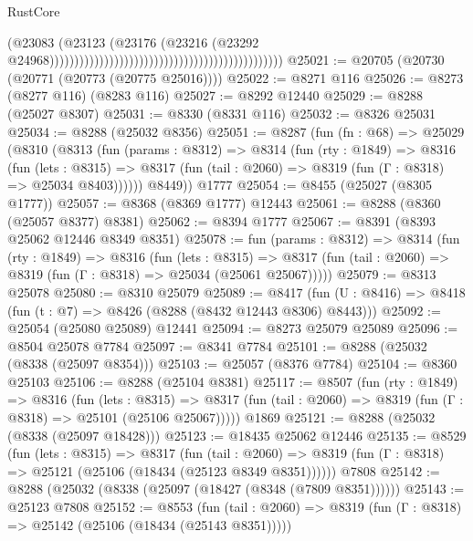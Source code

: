 \begin{lexlean}{RustCore}
\begin{coremodule}
                                                                                        (@23083
                                                                                          (@23123
                                                                                            (@23176
                                                                                              (@23216
                                                                                                (@23292
                                                                                                  @24968)))))))))))))))))))))))))))))))))))))))))))))))
@25021 := @20705 (@20730 (@20771 (@20773 (@20775 @25016))))
@25022 := @8271 @116
@25026 := @8273 (@8277 @116) (@8283 @116)
@25027 := @8292 @12440
@25029 := @8288 (@25027 @8307)
@25031 := @8330 (@8331 @116)
@25032 := @8326 @25031
@25034 := @8288 (@25032 @8356)
@25051 := @8287
    (fun (fn : @68) =>
    @25029
      (@8310
        (@8313
          (fun (params : @8312) =>
          @8314
            (fun (rty : @1849) =>
            @8316
              (fun (lets : @8315) =>
              @8317 (fun (tail : @2060) => @8319 (fun (Γ : @8318) => @25034 @8403))))))
        @8449))
    @1777
@25054 := @8455 (@25027 (@8305 @1777))
@25057 := @8368 (@8369 @1777) @12443
@25061 := @8288 (@8360 (@25057 @8377) @8381)
@25062 := @8394 @1777
@25067 := @8391 (@8393 @25062 @12446 @8349 @8351)
@25078 := fun (params : @8312) =>
  @8314
    (fun (rty : @1849) =>
    @8316
      (fun (lets : @8315) =>
      @8317 (fun (tail : @2060) => @8319 (fun (Γ : @8318) => @25034 (@25061 @25067)))))
@25079 := @8313 @25078
@25080 := @8310 @25079
@25089 := @8417
    (fun (U : @8416) => @8418 (fun (t : @7) => @8426 (@8288 (@8432 @12443 @8306) @8443)))
@25092 := @25054 (@25080 @25089) @12441
@25094 := @8273 @25079 @25089
@25096 := @8504 @25078 @7784
@25097 := @8341 @7784
@25101 := @8288 (@25032 (@8338 (@25097 @8354)))
@25103 := @25057 (@8376 @7784)
@25104 := @8360 @25103
@25106 := @8288 (@25104 @8381)
@25117 := @8507
    (fun (rty : @1849) =>
    @8316
      (fun (lets : @8315) =>
      @8317 (fun (tail : @2060) => @8319 (fun (Γ : @8318) => @25101 (@25106 @25067)))))
    @1869
@25121 := @8288 (@25032 (@8338 (@25097 @18428)))
@25123 := @18435 @25062 @12446
@25135 := @8529
    (fun (lets : @8315) =>
    @8317
      (fun (tail : @2060) =>
      @8319 (fun (Γ : @8318) => @25121 (@25106 (@18434 (@25123 @8349 @8351))))))
    @7808
@25142 := @8288 (@25032 (@8338 (@25097 (@18427 (@8348 (@7809 @8351))))))
@25143 := @25123 @7808
@25152 := @8553
    (fun (tail : @2060) => @8319 (fun (Γ : @8318) => @25142 (@25106 (@18434 (@25143 @8351)))))

\end{coremodule}
\end{lexlean}
